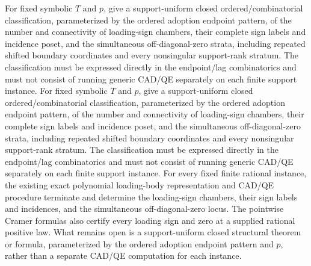 For fixed symbolic \(T\) and \(p\), give a support-uniform closed ordered/combinatorial classification, parameterized by the ordered adoption endpoint pattern, of the number and connectivity of loading-sign chambers, their complete sign labels and incidence poset, and the simultaneous off-diagonal-zero strata, including repeated shifted boundary coordinates and every nonsingular support-rank stratum. The classification must be expressed directly in the endpoint/lag combinatorics and must not consist of running generic CAD/QE separately on each finite support instance.
For fixed symbolic \(T\) and \(p\), give a support-uniform closed ordered/combinatorial classification, parameterized by the ordered adoption endpoint pattern, of the number and connectivity of loading-sign chambers, their complete sign labels and incidence poset, and the simultaneous off-diagonal-zero strata, including repeated shifted boundary coordinates and every nonsingular support-rank stratum. The classification must be expressed directly in the endpoint/lag combinatorics and must not consist of running generic CAD/QE separately on each finite support instance.
For every fixed finite rational instance, the existing exact polynomial loading-body representation and CAD/QE procedure terminate and determine the loading-sign chambers, their sign labels and incidences, and the simultaneous off-diagonal-zero locus.  The pointwise Cramer formulas also certify every loading sign and zero at a supplied rational positive law.  What remains open is a support-uniform closed structural theorem or formula, parameterized by the ordered adoption endpoint pattern and \(p\), rather than a separate CAD/QE computation for each instance.

